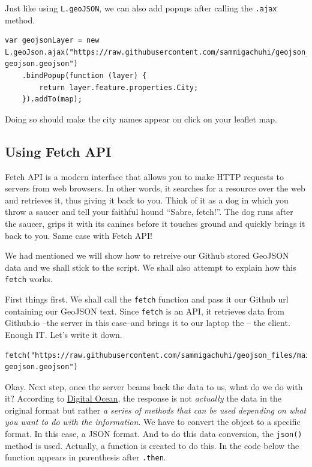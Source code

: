 \documentclass[
]{book}
\begin{document}
Just like using \texttt{L.geoJSON}, we can also add popups after calling the \texttt{.ajax} method.

\begin{verbatim}
var geojsonLayer = new L.geoJson.ajax("https://raw.githubusercontent.com/sammigachuhi/geojson_files/main/cities-geojson.geojson")
    .bindPopup(function (layer) {
        return layer.feature.properties.City;
    }).addTo(map);
\end{verbatim}

Doing so should make the city names appear on click on your leaflet map.

\hypertarget{using-fetch-api}{%
\subsection{Using Fetch API}\label{using-fetch-api}}

Fetch API is a modern interface that allows you to make HTTP requests to servers from web browsers. In other words, it searches for a resource over the web and retrieves it, thus giving it back to you. Think of it as a dog in which you throw a saucer and tell your faithful hound ``Sabre, fetch!''. The dog runs after the saucer, grips it with its canines before it touches ground and quickly brings it back to you. Same case with Fetch API!

We had mentioned we will show how to retreive our Github stored GeoJSON data and we shall stick to the script. We shall also attempt to explain how this \texttt{fetch} works.

First things first. We shall call the \texttt{fetch} function and pass it our Github url containing our GeoJSON text. Since \texttt{fetch} is an API, it retrieves data from Github.io --the server in this case--and brings it to our laptop the -- the client. Enough IT. Let's write it down.

\begin{verbatim}
fetch("https://raw.githubusercontent.com/sammigachuhi/geojson_files/main/cities-geojson.geojson")
\end{verbatim}

Okay. Next step, once the server beams back the data to us, what do we do with it? According to \href{https://www.digitalocean.com/community/tutorials/js-fetch-api}{Digital Ocean}, the response is not \emph{actually} the data in the original format but rather \emph{a series of methods that can be used depending on what you want to do with the information}. We have to convert the object to a specific format. In this case, a JSON format. And to do this data conversion, the \texttt{json()} method is used. Actually, a function is created to do this. In the code below the function appears in parenthesis after \texttt{.then}.
\end{document}
